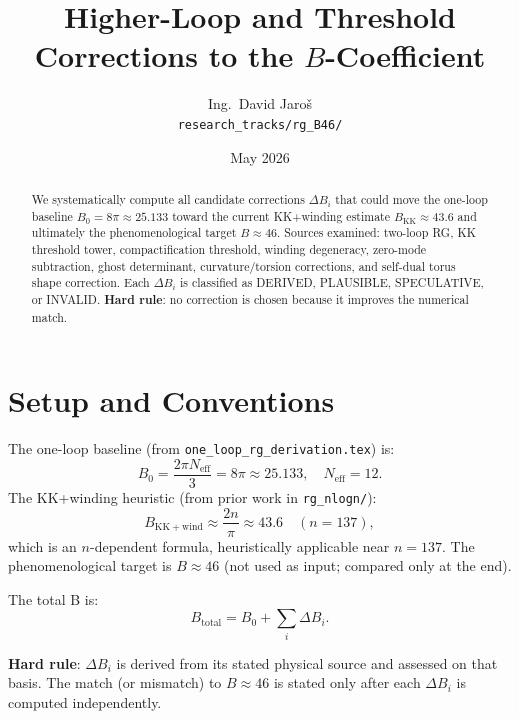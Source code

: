 \documentclass[11pt,a4paper]{article}
\title{Higher-Loop and Threshold Corrections to the $B$-Coefficient}
\author{Ing.\ David Jaro\v{s}\\
\small \texttt{research\_tracks/rg\_B46/}}
\date{May 2026}
\begin{document}
\maketitle

\begin{abstract}
We systematically compute all candidate corrections $\Delta B_i$ that could move the
one-loop baseline $B_0 = 8\pi \approx 25.133$ toward the current KK+winding estimate
$B_\mathrm{KK} \approx 43.6$ and ultimately the phenomenological target $B \approx 46$.
Sources examined: two-loop RG, KK threshold tower, compactification threshold,
winding degeneracy, zero-mode subtraction, ghost determinant, curvature/torsion
corrections, and self-dual torus shape correction.  Each $\Delta B_i$ is classified
as DERIVED, PLAUSIBLE, SPECULATIVE, or INVALID.  \textbf{Hard rule}: no correction
is chosen because it improves the numerical match.
\end{abstract}

\tableofcontents

\section{Setup and Conventions}

The one-loop baseline (from \texttt{one\_loop\_rg\_derivation.tex}) is:
\begin{equation}
  B_0 = \frac{2\pi N_\mathrm{eff}}{3} = 8\pi \approx 25.133,
  \quad N_\mathrm{eff} = 12.
  \label{eq:B0}
\end{equation}
The KK+winding heuristic (from prior work in \texttt{rg\_nlogn/}):
\begin{equation}
  B_\mathrm{KK+wind} \approx \frac{2n}{\pi} \approx 43.6
  \quad (n = 137),
  \label{eq:BKK}
\end{equation}
which is an $n$-dependent formula, heuristically applicable near $n = 137$.
The phenomenological target is $B \approx 46$ (not used as input; compared only at the end).

The total B is:
\begin{equation}
  B_\mathrm{total} = B_0 + \sum_i \Delta B_i.
\end{equation}

\textbf{Hard rule}: $\Delta B_i$ is derived from its stated physical source and
assessed on that basis.  The match (or mismatch) to $B \approx 46$ is stated
only after each $\Delta B_i$ is computed independently.
\end{document}
